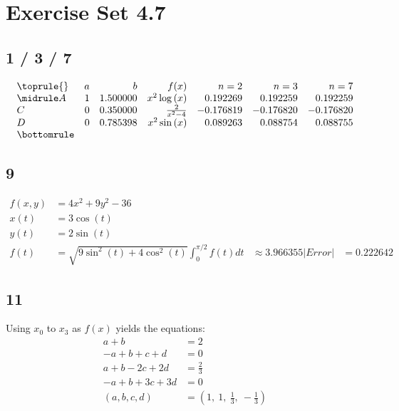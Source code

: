 \documentclass{oisinclass}
\begin{document}
\section*{Exercise Set 4.7}
\subsection*{1 / 3 / 7}
\[
	\begin{array}{lrrrrrr}
		\toprule
		{} & a & b        & f(x)                        & n = 2     & n=3       & n=7       \\
		\midrule
		A  & 1 & 1.500000 & x^{2} \log{\left(x \right)} & 0.192269  & 0.192259  & 0.192259  \\
		C  & 0 & 0.350000 & \frac{2}{x^{2} - 4}         & -0.176819 & -0.176820 & -0.176820 \\
		D  & 0 & 0.785398 & x^{2} \sin{\left(x \right)} & 0.089263  & 0.088754  & 0.088755  \\
		\bottomrule
	\end{array}
\]
\subsection*{9}
\begin{align*}
	f(x, y)                  & = 4 x^{2} + 9 y^{2} - 36                                           \\
	x(t)                     & = 3 \cos{\left(t \right)}                                          \\
	y(t)                     & = 2 \sin{\left(t \right)}                                          \\
	f(t)                     & = \sqrt{9 \sin^{2}{\left(t \right)} + 4 \cos^{2}{\left(t \right)}}
	\int_{0}^{\pi / 2}f(t)dt & \approx 3.966355
	|Error|                  & = 0.222642
\end{align*}
\subsection*{11}
Using \(x_0\) to \(x_3\) as \(f(x)\) yields the equations:
\begin{align*}
	a + b               & = 2                                                       \\
	- a + b + c + d     & = 0                                                       \\
	a + b - 2 c + 2 d   & = \frac{2}{3}                                             \\
	- a + b + 3 c + 3 d & = 0                                                       \\
	(a, b, c, d)        & = \left( 1, \  1, \  \frac{1}{3}, \  - \frac{1}{3}\right)
\end{align*}
\end{document}
